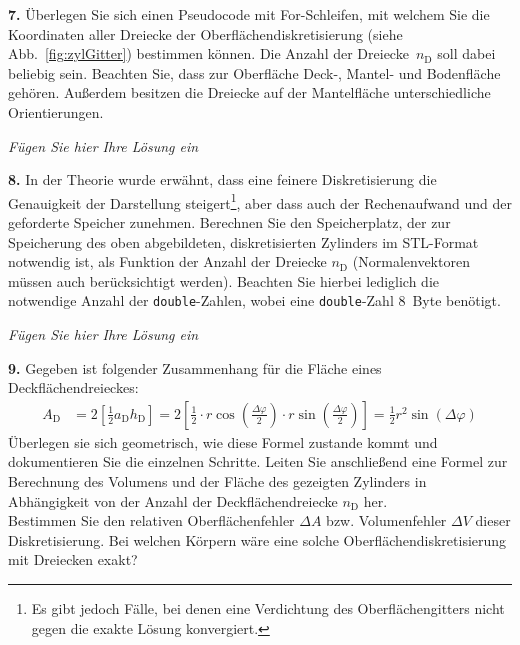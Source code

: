 \documentclass[Protokollheft.tex]{subfiles}
\begin{document}
    \begin{framed}
	\noindent \textbf{7.} Überlegen Sie sich einen Pseudocode mit For-Schleifen, mit welchem Sie die Koordinaten aller Dreiecke der Oberflächendiskretisierung (siehe Abb.~\ref{fig:zylGitter}) bestimmen können. Die Anzahl der Dreiecke~$n_\text{D}$ soll dabei beliebig sein. Beachten Sie, dass zur Oberfläche Deck-, Mantel- und Bodenfläche gehören. Außerdem besitzen die Dreiecke auf der Mantelfläche \glqq unterschiedliche Orientierungen\grqq.\label{exer:pseudocodeCylinder}
\end{framed}

\emph{Fügen Sie hier Ihre Lösung ein}

    \begin{framed}
	\noindent \textbf{8.} In der Theorie wurde erwähnt, dass eine feinere Diskretisierung die Genauigkeit der Darstellung steigert\footnote{Es gibt jedoch Fälle, bei denen eine Verdichtung des Oberflächengitters nicht gegen die exakte Lösung konvergiert.}, aber dass auch der Rechenaufwand und der geforderte Speicher zunehmen.
        Berechnen Sie den Speicherplatz, der zur Speicherung des oben abgebildeten, diskretisierten Zylinders im STL-Format notwendig ist, als Funktion der Anzahl der Dreiecke $n_\mathrm{D}$ (Normalenvektoren müssen auch berücksichtigt werden). Beachten Sie hierbei lediglich die notwendige Anzahl der \lstinline{double}-Zahlen, wobei eine \lstinline{double}-Zahl \SI{8}{Byte} benötigt.\label{exer:requiredStorage}
\end{framed}

\emph{Fügen Sie hier Ihre Lösung ein}

    \begin{framed}
	\noindent \textbf{9.} Gegeben ist folgender Zusammenhang für die Fläche eines Deckflächendreieckes:
        \begin{align}
        A_\text{D} &= 2 \left[\frac12 a_\text{D} h_\text{D}\right] = 2 \left[ \frac12 \cdot r \cos\left(\frac{\Delta \varphi}{2}\right)\cdot r \sin\left(\frac{\Delta \varphi}{2}\right)  \right] = \frac12 r^2 \sin(\Delta\varphi)
        \end{align}
        Überlegen sie sich geometrisch, wie diese Formel zustande kommt und dokumentieren Sie die einzelnen Schritte. Leiten Sie anschließend eine Formel zur Berechnung des Volumens und der Fläche des gezeigten Zylinders in Abhängigkeit von der Anzahl der Deckflächendreiecke $n_\mathrm{D}$ her.\\
        Bestimmen Sie den relativen Oberflächenfehler $\Delta A$ bzw. Volumenfehler $\Delta V$ dieser Diskretisierung.
        Bei welchen Körpern wäre eine solche Oberflächendiskretisierung mit Dreiecken exakt?\label{exer:deltaAdeltaV}
\end{framed}
\end{document}

